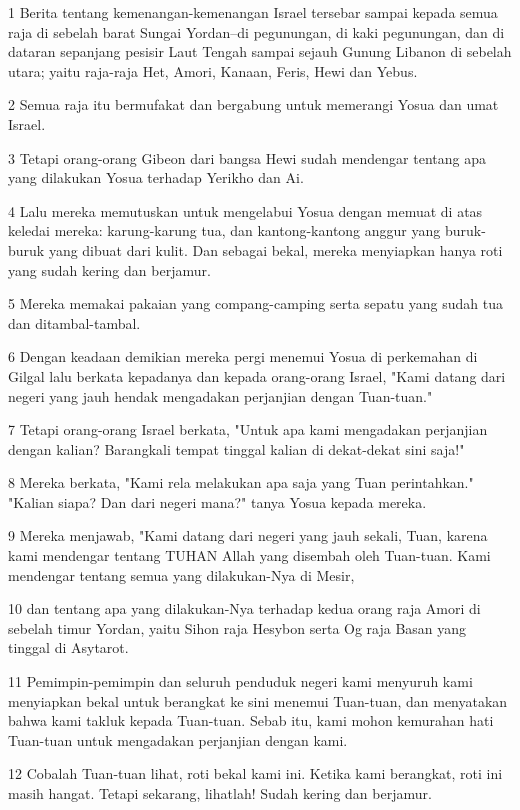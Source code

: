 \par 1 Berita tentang kemenangan-kemenangan Israel tersebar sampai kepada semua raja di sebelah barat Sungai Yordan--di pegunungan, di kaki pegunungan, dan di dataran sepanjang pesisir Laut Tengah sampai sejauh Gunung Libanon di sebelah utara; yaitu raja-raja Het, Amori, Kanaan, Feris, Hewi dan Yebus.
\par 2 Semua raja itu bermufakat dan bergabung untuk memerangi Yosua dan umat Israel.
\par 3 Tetapi orang-orang Gibeon dari bangsa Hewi sudah mendengar tentang apa yang dilakukan Yosua terhadap Yerikho dan Ai.
\par 4 Lalu mereka memutuskan untuk mengelabui Yosua dengan memuat di atas keledai mereka: karung-karung tua, dan kantong-kantong anggur yang buruk-buruk yang dibuat dari kulit. Dan sebagai bekal, mereka menyiapkan hanya roti yang sudah kering dan berjamur.
\par 5 Mereka memakai pakaian yang compang-camping serta sepatu yang sudah tua dan ditambal-tambal.
\par 6 Dengan keadaan demikian mereka pergi menemui Yosua di perkemahan di Gilgal lalu berkata kepadanya dan kepada orang-orang Israel, "Kami datang dari negeri yang jauh hendak mengadakan perjanjian dengan Tuan-tuan."
\par 7 Tetapi orang-orang Israel berkata, "Untuk apa kami mengadakan perjanjian dengan kalian? Barangkali tempat tinggal kalian di dekat-dekat sini saja!"
\par 8 Mereka berkata, "Kami rela melakukan apa saja yang Tuan perintahkan." "Kalian siapa? Dan dari negeri mana?" tanya Yosua kepada mereka.
\par 9 Mereka menjawab, "Kami datang dari negeri yang jauh sekali, Tuan, karena kami mendengar tentang TUHAN Allah yang disembah oleh Tuan-tuan. Kami mendengar tentang semua yang dilakukan-Nya di Mesir,
\par 10 dan tentang apa yang dilakukan-Nya terhadap kedua orang raja Amori di sebelah timur Yordan, yaitu Sihon raja Hesybon serta Og raja Basan yang tinggal di Asytarot.
\par 11 Pemimpin-pemimpin dan seluruh penduduk negeri kami menyuruh kami menyiapkan bekal untuk berangkat ke sini menemui Tuan-tuan, dan menyatakan bahwa kami takluk kepada Tuan-tuan. Sebab itu, kami mohon kemurahan hati Tuan-tuan untuk mengadakan perjanjian dengan kami.
\par 12 Cobalah Tuan-tuan lihat, roti bekal kami ini. Ketika kami berangkat, roti ini masih hangat. Tetapi sekarang, lihatlah! Sudah kering dan berjamur.
